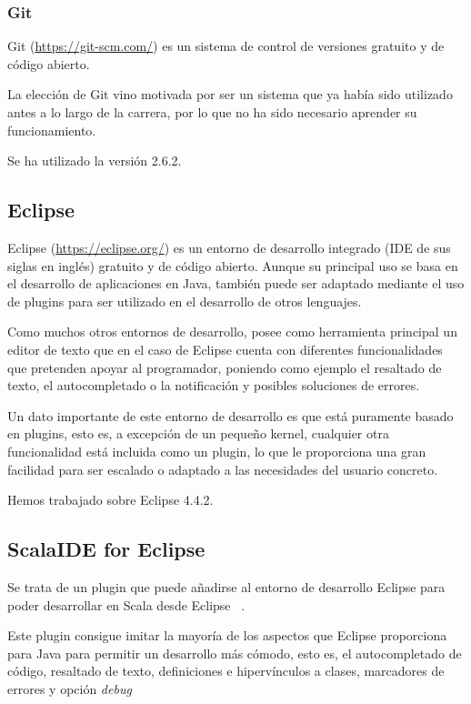\subsubsection{Git}

Git (\url{https://git-scm.com/}) es un sistema de control de versiones gratuito y de código abierto.

La elección de Git vino motivada por ser un sistema que ya había sido utilizado antes a lo largo de la carrera, por lo que no ha sido necesario aprender su funcionamiento.

Se ha utilizado la versión 2.6.2.


\subsection{Eclipse}
Eclipse (\url{https://eclipse.org/}) es un entorno de desarrollo integrado (IDE de sus siglas en inglés) gratuito y de código abierto. Aunque su principal uso se basa en el desarrollo de aplicaciones en Java, también puede ser adaptado mediante el uso de plugins para ser utilizado en el desarrollo de otros lenguajes.

Como muchos otros entornos de desarrollo, posee como herramienta principal un editor de texto que en el caso de Eclipse cuenta con diferentes funcionalidades que pretenden apoyar al programador, poniendo como ejemplo el resaltado de texto, el autocompletado o la notificación y posibles soluciones de errores.

Un dato importante de este entorno de desarrollo es que está puramente basado en plugins, esto es, a excepción de un pequeño kernel, cualquier otra funcionalidad está incluida como un plugin, lo que le proporciona una gran facilidad para ser escalado o adaptado a las necesidades del usuario concreto.

Hemos trabajado sobre Eclipse 4.4.2.

\subsection{ScalaIDE for Eclipse}

Se trata de un plugin que puede añadirse al entorno de desarrollo Eclipse para poder desarrollar en Scala desde Eclipse~\cite{ScalaIDEPage} .

Este plugin consigue imitar la mayoría de los aspectos que Eclipse proporciona para Java para permitir un desarrollo más cómodo, esto es, el autocompletado de código, resaltado de texto, definiciones e hipervínculos a clases, marcadores de errores y opción \textit{debug}

